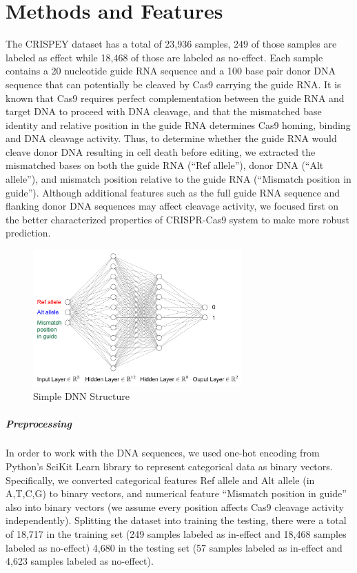 \documentclass[journal]{IEEEtran}
\begin{document}
\section*{Methods and Features}
The CRISPEY dataset has a total of  23,936 samples, 249 of those samples are labeled as effect while 18,468 of those are labeled as no-effect. Each sample contains a 20 nucleotide guide RNA sequence and a 100 base pair donor DNA sequence that can potentially be cleaved by Cas9 carrying the guide RNA. It is known that Cas9 requires perfect complementation between the guide RNA and target DNA to proceed with DNA cleavage, and that the mismatched base identity and relative position in the guide RNA determines Cas9 homing, binding and DNA cleavage activity. Thus, to determine whether the guide RNA would cleave donor DNA resulting in cell death before editing, we extracted the mismatched bases on both the guide RNA (“Ref allele”), donor DNA (“Alt allele”), and mismatch position relative to the guide RNA (“Mismatch position in guide”). Although additional features such as the full guide RNA sequence and flanking donor DNA sequences may affect cleavage activity, we focused first on the better characterized properties of CRISPR-Cas9 system to make more robust prediction.

\begin{figure}
	\begin{center} 
		\includegraphics[width=8cm]{../NN}
		\caption{Simple DNN Structure }
	\end{center}
\end{figure}


\subparagraph*{Preprocessing}
In order to work with the DNA sequences, we used one-hot encoding from Python's SciKit Learn library to represent categorical data as binary vectors. Specifically, we converted categorical features Ref allele and Alt allele (in {A,T,C,G}) to binary vectors, and numerical feature “Mismatch position in guide” also into binary vectors (we assume every position affects Cas9 cleavage activity independently). Splitting the dataset into training the testing, there were a total of 18,717 in the training set (249 samples labeled as in-effect and 18,468 samples labeled as no-effect) 4,680 in the testing set (57 samples labeled as in-effect and 4,623 samples labeled as no-effect).
\end{document}
